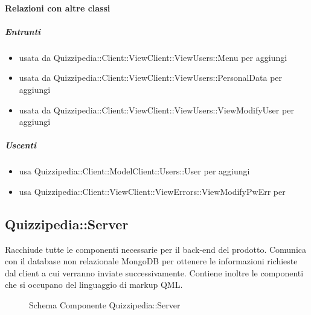 \paragraph{Relazioni con altre classi}
\subparagraph{Entranti}
\begin{itemize}
\item usata da Quizzipedia::Client::ViewClient::ViewUsers::Menu per aggiungi
\item usata da Quizzipedia::Client::ViewClient::ViewUsers::PersonalData per aggiungi
\item usata da Quizzipedia::Client::ViewClient::ViewUsers::ViewModifyUser per aggiungi
\end{itemize}
\subparagraph{Uscenti}
\begin{itemize}
\item usa Quizzipedia::Client::ModelClient::Users::User per aggiungi
\item usa Quizzipedia::Client::ViewClient::ViewErrors::ViewModifyPwErr per 
\end{itemize}
\subsection{Quizzipedia::Server}
Racchiude tutte le componenti necessarie per il back-end del prodotto. Comunica con il database non relazionale MongoDB per ottenere le informazioni richieste dal client a cui verranno inviate successivamente.
Contiene inoltre le componenti che si occupano del linguaggio di markup QML.
\begin{figure}[H]
\centering
\noindent{}
\caption[Schema Componente Server]{Schema Componente Quizzipedia::Server}
\end{figure}
